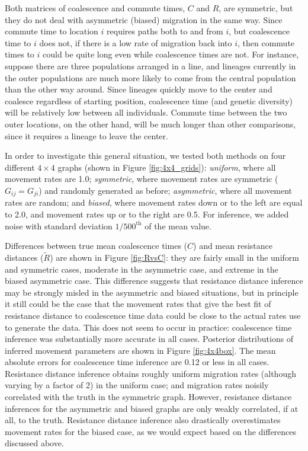 \documentclass{article}
\newcommand{\comdist}{\widetilde{R}}
\begin{document}
Both matrices of coalescence and commute times, $C$ and $R$, are symmetric,
but they do not deal with asymmetric (biased) migration in the same way.
Since commute time to location $i$ requires paths both to and from $i$,
but coalescence time to $i$ does not,
if there is a low rate of migration back into $i$,
then commute times to $i$ could be quite long even while coalescence times are not.
For instance, suppose there are three populations arranged in a line,
and lineages currently in the outer populations are much more likely to come from the central population
than the other way around.
Since lineages quickly move to the center and coalesce regardless of starting position,
coalescence time (and genetic diversity) will be relatively low between all individuals. 
Commute time between the two outer locations, on the other hand,
will be much longer than other comparisons, since it requires a lineage to leave the center.

In order to investigate this general situation,
we tested both methods on four different $4 \times 4$ graphs (shown in Figure \ref{fig:4x4_grids}):
\emph{uniform}, where all movement rates are 1.0;
\emph{symmetric}, where movement rates are symmetric ($G_{ij} = G_{ji}$)
and randomly generated as before;
\emph{asymmetric}, where all movement rates are random;
and \emph{biased}, where movement rates down or to the left are equal to 2.0,
and movement rates up or to the right are 0.5.
For inference, we added noise with standard deviation $1/500^\text{th}$ of the mean value.

Differences between true mean coalescence times ($C$) and mean resistance distances ($\comdist$)
are shown in Figure \ref{fig:RvsC}: 
they are fairly small in the uniform and symmetric cases, moderate in the asymmetric case, 
and extreme in the biased asymmetric case.
This difference suggests that resistance distance inference may be strongly misled 
in the asymmetric and biased situations,
but in principle it still could be the case that 
the movement rates that give the best fit of resistance distance
to coalescence time data could be close to the actual rates use to generate the data.
This does not seem to occur in practice:
coalescence time inference was substantially more accurate in all cases.
Posterior distributions of inferred movement parameters are shown in Figure \ref{fig:4x4box}.
The mean absolute errors for coalescence time inference are 0.12 or less in all cases.
Resistance distance inference obtains roughly uniform migration rates
(although varying by a factor of 2) in the uniform case;
and migration rates noisily correlated with the truth in the symmetric graph.
However, resistance distance inferences for the asymmetric and biased graphs are only weakly correlated, 
if at all, to the truth.
Resistance distance inference also drastically overestimates movement rates for the biased case,
as we would expect based on the differences discussed above.
\end{document}
